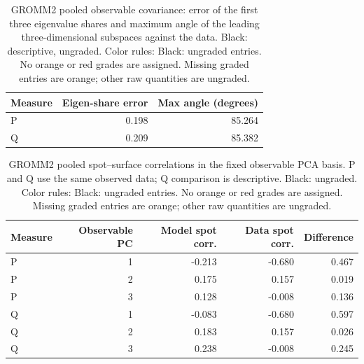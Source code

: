\documentclass[11pt]{article}
\begin{document}
\begin{table}[H]\centering\small\setlength{\tabcolsep}{4pt}
\caption{GROMM2 pooled observable covariance: error of the first three eigenvalue shares and maximum angle of the leading three-dimensional subspaces against the data. Black: descriptive, ungraded. Color rules: Black: ungraded entries. No orange or red grades are assigned. Missing graded entries are orange; other raw quantities are ungraded.}\label{tab:gromm2-covariance-detail}
\begin{tabular}{@{}lrr@{}}
\toprule
Measure & Eigen-share error & Max angle (degrees) \\
\midrule
P & 0.198 & 85.264 \\
Q & 0.209 & 85.382 \\
\bottomrule\end{tabular}\end{table}

\begin{table}[H]\centering\small\setlength{\tabcolsep}{4pt}
\caption{GROMM2 pooled spot--surface correlations in the fixed observable PCA basis. P and Q use the same observed data; Q comparison is descriptive. Black: ungraded. Color rules: Black: ungraded entries. No orange or red grades are assigned. Missing graded entries are orange; other raw quantities are ungraded.}\label{tab:gromm2-leverage}
\begin{tabular}{@{}lrrrr@{}}
\toprule
Measure & Observable PC & Model spot corr. & Data spot corr. & Difference \\
\midrule
P & 1 & -0.213 & -0.680 & 0.467 \\
P & 2 & 0.175 & 0.157 & 0.019 \\
P & 3 & 0.128 & -0.008 & 0.136 \\
Q & 1 & -0.083 & -0.680 & 0.597 \\
Q & 2 & 0.183 & 0.157 & 0.026 \\
Q & 3 & 0.238 & -0.008 & 0.245 \\
\bottomrule\end{tabular}\end{table}
\end{document}
